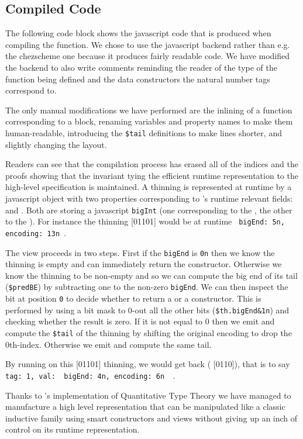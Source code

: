 \subsection{Compiled Code}\label{sec:compiledview}

The following code block shows the javascript code that is produced when compiling the
 function. We chose to use the javascript backend rather than e.g.
the chezscheme one because it produces fairly readable code.
%
We have modified the backend to also write comments reminding the reader of the type
of the function being defined and the data constructors the natural number tags
correspond to.

The only manual modifications we have performed are the inlining of a function
corresponding to a  block, renaming variables and property names
to make them human-readable, introducing the \texttt{\$tail} definitions to make
lines shorter, and slightly changing the layout.



Readers can see that the compilation process has erased all of the indices
and the proofs
showing that the invariant tying the efficient runtime representation to the
high-level specification is maintained.
%
A thinning is represented at runtime by a javascript object with two properties
corresponding to 's runtime relevant fields: 
and .
%
Both are storing a javascript \texttt{bigInt} (one corresponding to the
, the other to the ).
%
For instance the thinning [01101] would be at runtime
\texttt{{ bigEnd: 5n, encoding: 13n }}.
%

The view proceeds in two steps. First if the \texttt{bigEnd} is \texttt{0n}
then we know the thinning is empty and can immediately return the 
constructor.
%
Otherwise we know the thinning to be non-empty and so we can compute the big end
of its tail (\texttt{\$predBE}) by subtracting one to the non-zero \texttt{bigEnd}.
We can then inspect the bit at position \texttt{0} to decide whether to return a
 or a  constructor. This is performed by using a
bit mask to 0-out all the other bits (\texttt{\$th.bigEnd\&1n}) and checking whether
the result is zero.
%
If it is not equal to 0 then we emit  and compute the \texttt{\$tail}
of the thinning by shifting the original encoding to drop the 0th-index. Otherwise we
emit  and compute the same tail.

By running  on this [01101] thinning, we would get
back ( [0110]), that is to say
\texttt{{ tag: 1, val: { bigEnd: 4n, encoding: 6n } }}.

Thanks to \idris{}'s implementation of Quantitative Type Theory we have managed
to manufacture a high level representation that can be manipulated like a classic
inductive family using smart constructors and views without giving up an inch of
control on its runtime representation.
